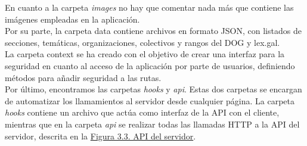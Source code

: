 En cuanto a la carpeta {\it images} no hay que comentar nada más que contiene las imágenes empleadas en la aplicación.
\\

Por su parte, la carpeta data contiene archivos en formato JSON, con listados de secciones, temáticas, organizaciones, colectivos y rangos del DOG y lex.gal.
\\

La carpeta context se ha creado con el objetivo de crear una interfaz para la seguridad en cuanto al acceso de la aplicación por parte de usuarios, definiendo métodos para añadir seguridad a las rutas.
\\

Por último, encontramos las carpetas {\it hooks} y {\it api}. Estas dos carpetas se encargan de automatizar los llamamientos al servidor desde cualquier página. La carpeta {\it hooks} contiene un archivo que actúa como interfaz de la API con el cliente, mientras que en la carpeta {\it api} se realizar todas las llamadas HTTP a la API del servidor, descrita en la \hyperref[enlaceAPIServidor]{Figura 3.3. API del servidor}.